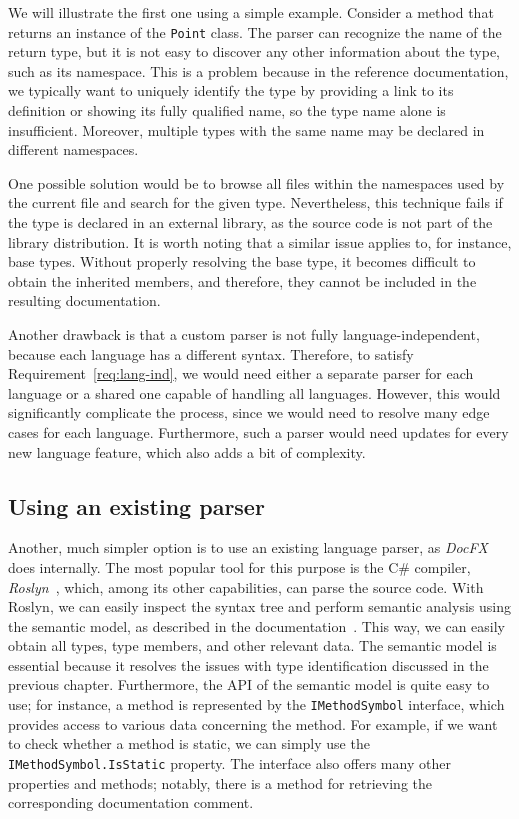 We will illustrate the first one using a simple example. Consider a method that returns an instance of the \texttt{Point} class.
The parser can recognize the name of the return type, but it is not easy to discover any other information about the type, such as its namespace.
This is a problem because in the reference documentation, we typically want to uniquely identify the type by providing a link to its definition or showing its fully qualified name, so the type name alone is insufficient.
Moreover, multiple types with the same name may be declared in different namespaces.

One possible solution would be to browse all files within the namespaces used by the current file and search for the given type.
Nevertheless, this technique fails if the type is declared in an external library, as the source code is not part of the library distribution.
It is worth noting that a similar issue applies to, for instance, base types. 
Without properly resolving the base type, it becomes difficult to obtain the inherited members, and therefore, they cannot be included in the resulting documentation.

Another drawback is that a custom parser is not fully language-independent, because each language has a different syntax. 
Therefore, to satisfy Requirement~\ref{req:lang-ind}, we would need either a separate parser for each language or a shared one capable of handling all languages.
However, this would significantly complicate the process, since we would need to resolve many edge cases for each language.
Furthermore, such a parser would need updates for every new language feature, which also adds a bit of complexity.

\subsection*{Using an existing parser}

Another, much simpler option is to use an existing language parser, as \textit{DocFX} does internally. 
The most popular tool for this purpose is the C\# compiler, \textit{Roslyn}~\cite{roslyn}, which, among its other capabilities, can parse the source code.
With Roslyn, we can easily inspect the syntax tree and perform semantic analysis using the semantic model, as described in the documentation~\cite{roslyn}.
This way, we can easily obtain all types, type members, and other relevant data.
The semantic model is essential because it resolves the issues with type identification discussed in the previous chapter.
Furthermore, the API of the semantic model is quite easy to use; for instance, a method is represented by the \texttt{IMethodSymbol} interface, which provides access to various data concerning the method.
For example, if we want to check whether a method is static, we can simply use the \texttt{IMethodSymbol.IsStatic} property. 
The interface also offers many other properties and methods; notably, there is a method for retrieving the corresponding documentation comment.

